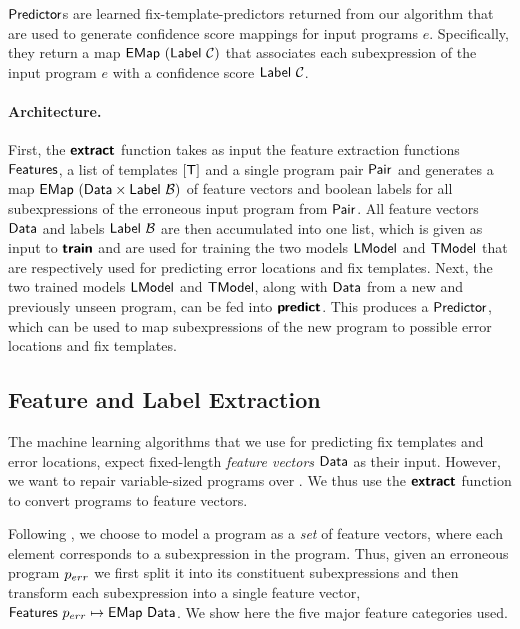 $\mathsf{Predictor}$s are learned fix-template-predictors returned from our algorithm
that are used to generate confidence score mappings for input programs $e$.
Specifically, they return a map $\mathsf{EMap}\ (\mathsf{Label}\ \mathcal{C})$ that associates each
subexpression of the input program $e$ with a confidence score
$\mathsf{Label}\ \mathcal{C}$.

\paragraph{Architecture.}
First, the $\bm{\mathsf{extract}}$ function takes as input the feature extraction
functions $\mathsf{Features}$, a list of templates $[\mathsf{T}]$ and a single program
pair $\mathsf{Pair}$ and generates a map $\mathsf{EMap}\ (\mathsf{Data} \times
\mathsf{Label}\ \mathcal{B})$ of feature vectors and boolean labels for all
subexpressions of the erroneous input program from $\mathsf{Pair}$.
%
All feature vectors $\mathsf{Data}$ and labels $\mathsf{Label}\ \mathcal{B}$ are then
accumulated into one list, which is given as input to $\bm{\mathsf{train}}$ and are used
for training the two models $\mathsf{LModel}$ and $\mathsf{TModel}$ that are respectively used
for predicting error locations and fix templates.
%
Next, the two trained models $\mathsf{LModel}$ and $\mathsf{TModel}$, along with $\mathsf{Data}$ from
a new and previously unseen program, can be fed into $\bm{\mathsf{predict}}$. This
produces a $\mathsf{Predictor}$, which can be used to map subexpressions of the new
program to possible error locations and fix templates.




\subsection{Feature and Label Extraction}
\label{sec:templ-pred:extract}
The machine learning algorithms that we use for predicting fix templates and
error locations, expect fixed-length \emph{feature vectors} $\mathsf{Data}$ as their
input. However, we want to repair variable-sized programs over \lang. We thus
use the $\bm{\mathsf{extract}}$ function to convert programs to feature vectors.

Following \citep{Seidel:2017}, we choose to model a program as a \emph{set} of
feature vectors, where each element corresponds to a subexpression in the
program. Thus, given an erroneous program $p_{err}$ we first split it into its
constituent subexpressions and then transform each subexpression into a single
feature vector, \ie $\mathsf{Features}\ p_{err} \mapsto \mathsf{EMap}\ \mathsf{Data}$. We show here
the five major feature categories used.

